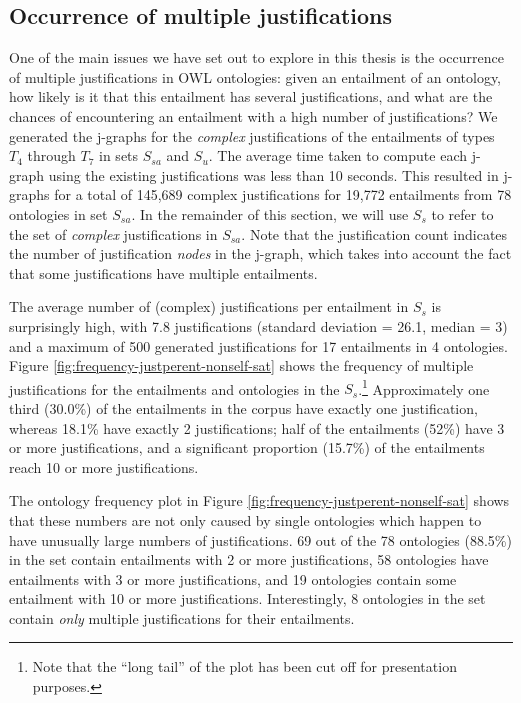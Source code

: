 \subsection{Occurrence of multiple justifications}

One of the main issues we have set out to explore in this thesis is the occurrence of multiple justifications in OWL ontologies: given an entailment of an ontology, how likely is it that this entailment has several justifications, and what are the chances of encountering an entailment with a high number of justifications? We generated the j-graphs for the \emph{complex} justifications of the entailments of types $T_{4}$ through $T_{7}$ in sets $S_{sa}$ and $S_{u}$. The average time taken to compute each j-graph using the existing justifications was less than 10 seconds. This resulted in j-graphs for a total of 145,689 complex justifications for 19,772 entailments from 78 ontologies in set $S_{sa}$. In the remainder of this section, we will use $S_{s}$ to refer to the set of \emph{complex} justifications in $S_{sa}$. Note that the justification count indicates the number of justification \emph{nodes} in the j-graph, which takes into account the fact that some justifications have multiple entailments. 

The average number of (complex) justifications per entailment in $S_{s}$ is surprisingly high, with 7.8 justifications (standard deviation \sdev = 26.1, median \median = 3) and a maximum of 500 generated justifications for 17 entailments in 4 ontologies. Figure \ref{fig:frequency-justperent-nonself-sat} shows the frequency of multiple justifications for the entailments and ontologies in the $S_{s}$.\footnote{Note that the \enquote{long tail} of the plot has been cut off for presentation purposes.} Approximately one third (30.0\%) of the entailments in the corpus have exactly one justification, whereas 18.1\% have exactly 2 justifications; half of the entailments (52\%) have 3 or more justifications, and a significant proportion (15.7\%) of the entailments reach 10 or more justifications.

The ontology frequency plot in Figure \ref{fig:frequency-justperent-nonself-sat} shows that these numbers are not only caused by single ontologies which happen to have unusually large numbers of justifications. 69 out of the 78 ontologies (88.5\%) in the set contain entailments with 2 or more justifications, 58 ontologies have entailments with 3 or more justifications, and 19 ontologies contain some entailment with 10 or more justifications. Interestingly, 8 ontologies in the set contain \emph{only} multiple justifications for their entailments.


